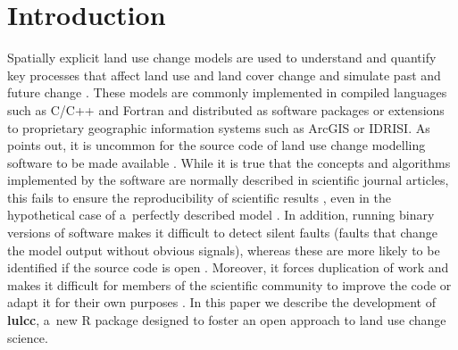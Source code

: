 \documentclass{icldt}\usepackage[]{graphicx}\usepackage[]{color}
\begin{document}

\newpage
\section{Introduction}

Spatially explicit land use change models are used to understand and quantify key processes that affect land use and land cover change and simulate past and future change \citep{veldkamp2001,mas2014}. These models are commonly implemented in compiled languages such as C/C++ and Fortran and distributed as software packages or extensions to proprietary geographic information systems such as ArcGIS or IDRISI. As \citet{rosa2014} points out, it is uncommon for the source code of land use change modelling software to be made available \citep[e.g.][]{verburg2002,soares-filho2002,verburg2009,schaldach2011}. While it is true that the concepts and algorithms implemented by the software are normally described in scientific journal articles, this fails to ensure the reproducibility of scientific results \citep{peng2011,morin2012}, even in the hypothetical case of a~perfectly described model \citep{ince2012}. In addition, running binary versions of software makes it difficult to detect silent faults (faults that change the model output without obvious signals), whereas these are more likely to be identified if the source code is open \citep{cai2012}. Moreover, it forces duplication of work and makes it difficult for members of the scientific community to improve the code or adapt it for their own purposes \citep{morin2012,pebesma2012,steiniger2013}. In this paper we describe the development of \textbf{lulcc}, a~new R package designed to foster an open approach to land use change science. \\
\end{document}
